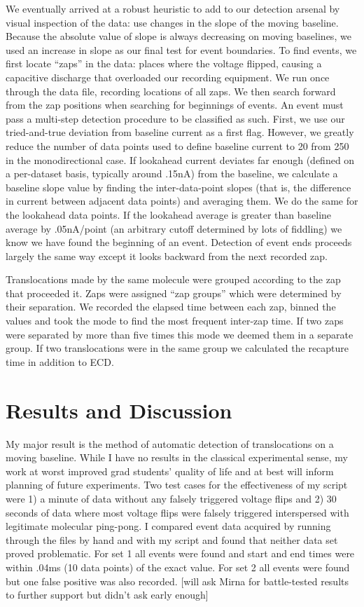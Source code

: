 \documentclass[aps,prl,preprint,groupedaddress]{revtex4}
\begin{document}
We eventually arrived at a robust heuristic to add to our detection arsenal by visual inspection of the data: use changes in the slope of the moving baseline.
Because the absolute value of slope is always decreasing on moving baselines, we used an increase in slope as our final test for event boundaries.
To find events, we first locate ``zaps'' in the data: places where the voltage flipped, causing a capacitive discharge that overloaded our recording equipment.
We run once through the data file, recording locations of all zaps.
We then search forward from the zap positions when searching for beginnings of events.
An event must pass a multi-step detection procedure to be classified as such.
First, we use our tried-and-true deviation from baseline current as a first flag.
However, we greatly reduce the number of data points used to define baseline current to 20 from 250 in the monodirectional case.
If lookahead current deviates far enough (defined on a per-dataset basis, typically around .15nA) from the baseline, we calculate a baseline slope value by finding the inter-data-point slopes (that is, the difference in current between adjacent data points) and averaging them.
We do the same for the lookahead data points.
If the lookahead average is greater than baseline average by .05nA/point (an arbitrary cutoff determined by lots of fiddling) we know we have found the beginning of an event.
Detection of event ends proceeds largely the same way except it looks backward from the next recorded zap.

Translocations made by the same molecule were grouped according to the zap that proceeded it.
Zaps were assigned ``zap groups'' which were determined by their separation.
We recorded the elapsed time between each zap, binned the values and took the mode to find the most frequent inter-zap time.
If two zaps were separated by more than five times this mode we deemed them in a separate group.
If two translocations were in the same group we calculated the recapture time in addition to ECD.

\section{Results and Discussion}

My major result is the method of automatic detection of translocations on a moving baseline.
While I have no results in the classical experimental sense, my work at worst improved grad students' quality of life and at best will inform planning of future experiments.
Two test cases for the effectiveness of my script were 1) a minute of data without any falsely triggered voltage flips and 2) 30 seconds of data where most voltage flips were falsely triggered interspersed with legitimate molecular ping-pong.
I compared event data acquired by running through the files by hand and with my script and found that neither data set proved problematic.
For set 1 all events were found and start and end times were within .04ms (10 data points) of the exact value.
For set 2 all events were found but one false positive was also recorded.
[will ask Mirna for battle-tested results to further support but didn't ask early enough]
\end{document}
